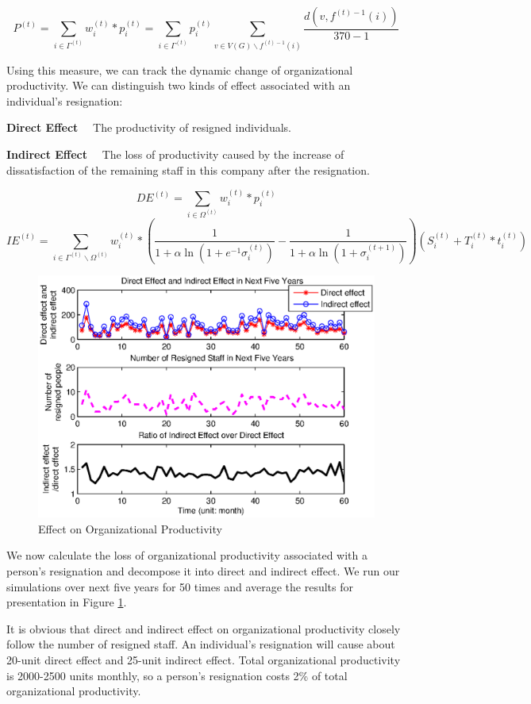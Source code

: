 \documentclass[tcn = 37075, sheet = false, abstract = false]{mcmthesis}
\begin{document}
$$\displaystyle P^{(t)}=\sum\limits_{i\in\Gamma^{(t)}} w_i^{(t)}*p_i^{(t)}=\sum\limits_{i\in\Gamma^{(t)}}p_i^{(t)}\sum\limits_{v\in V(G)\backslash f^{(t)-1}(i)}\frac{d(v,f^{(t)-1}(i))}{370-1}$$

Using this measure, we can track the dynamic change of organizational productivity. We can distinguish two kinds of effect associated with an individual's resignation:

\noindent \textbf{Direct Effect} \ \ The productivity of resigned individuals.


\noindent \textbf{Indirect Effect} \ \ The loss of productivity caused by the increase of dissatisfaction of the remaining staff in this company after the resignation.

$$DE^{(t)}=\sum\limits_{i\in\Omega^{(t)}}w_i^{(t)}*p_i^{(t)}$$ $$IE^{(t)}=\sum\limits_{i\in\Gamma^{(t)}\backslash\Omega^{(t)}} w_i^{(t)}*(\frac{1}{1+\alpha\ln{(1+e^{-1}\sigma_i^{(t)})}}-\frac{1}{1+\alpha\ln{(1+\sigma_i^{(t+1)})}})(S_i^{(t)}+T_i^{(t)}*t_i^{(t)})$$

\begin{figure}[htb!]
\centering
\includegraphics[width=14cm]{figures/Productivity_figure.eps}
\caption{Effect on Organizational Productivity} 
\label{fig:3}
\end{figure}

We now calculate the loss of organizational productivity associated with a person's resignation and decompose it into direct and indirect effect. We run our simulations over next five years for 50 times and average the results for presentation in Figure \ref{fig:3}.

It is obvious that direct and indirect effect on organizational productivity closely follow the number of resigned staff. An individual's resignation will cause about 20-unit direct effect and 25-unit indirect effect. Total organizational productivity is 2000-2500 units monthly, so a person's resignation costs 2\% of total organizational productivity.
\end{document}
